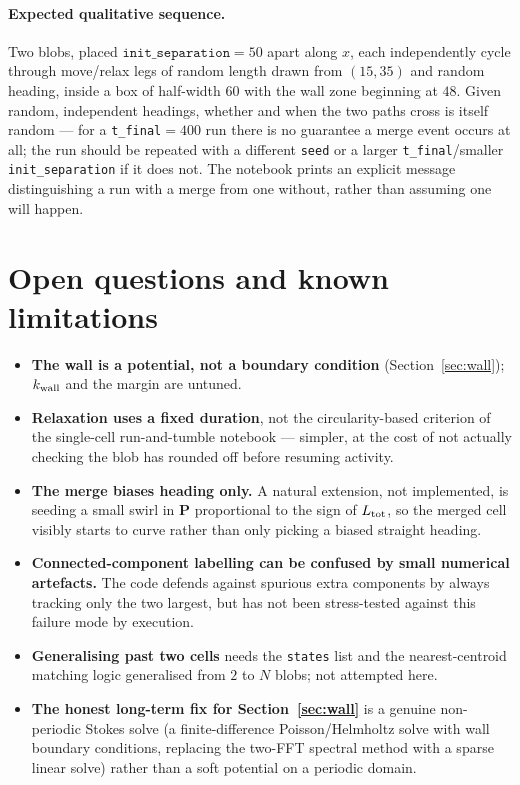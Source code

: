 \documentclass[11pt]{article}
\newcommand{\bP}{\mathbf{P}}
\begin{document}
\paragraph{Expected qualitative sequence.} Two blobs, placed
$\texttt{init\_separation}=50$ apart along $x$, each independently
cycle through move/relax legs of random length drawn from
$(15,35)$ and random heading, inside a box of half-width $60$ with
the wall zone beginning at $48$. Given random, independent headings,
whether and when the two paths cross is itself random — for a
\texttt{t\_final}$=400$ run there is no guarantee a merge event occurs
at all; the run should be repeated with a different \texttt{seed} or
a larger \texttt{t\_final}/smaller \texttt{init\_separation} if it
does not. The notebook prints an explicit message distinguishing a
run with a merge from one without, rather than assuming one will
happen.

\section{Open questions and known limitations}
\label{sec:limitations}

\begin{itemize}
\item \textbf{The wall is a potential, not a boundary condition}
(Section~\ref{sec:wall}); $k_{\rm wall}$ and the margin are untuned.
\item \textbf{Relaxation uses a fixed duration}, not the
circularity-based criterion of the single-cell run-and-tumble
notebook — simpler, at the cost of not actually checking the blob has
rounded off before resuming activity.
\item \textbf{The merge biases heading only.} A natural extension,
not implemented, is seeding a small swirl in $\bP$ proportional to the
sign of $L_{\rm tot}$, so the merged cell visibly starts to curve
rather than only picking a biased straight heading.
\item \textbf{Connected-component labelling can be confused by small
numerical artefacts.} The code defends against spurious extra
components by always tracking only the two largest, but has not been
stress-tested against this failure mode by execution.
\item \textbf{Generalising past two cells} needs the \texttt{states}
list and the nearest-centroid matching logic generalised from $2$ to
$N$ blobs; not attempted here.
\item \textbf{The honest long-term fix for Section~\ref{sec:wall}} is
a genuine non-periodic Stokes solve (a finite-difference
Poisson/Helmholtz solve with wall boundary conditions, replacing the
two-FFT spectral method with a sparse linear solve) rather than a soft
potential on a periodic domain.
\end{itemize}
\end{document}
